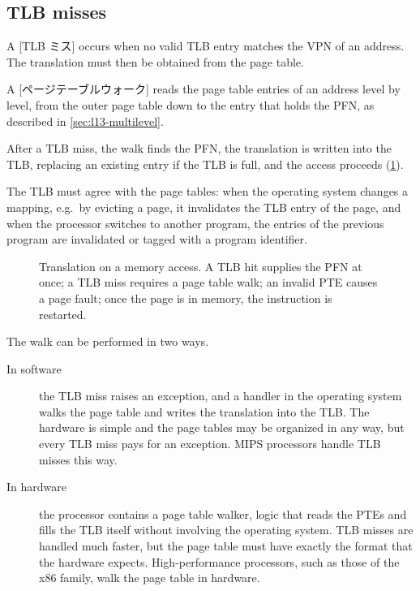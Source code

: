 \documentclass[../main.tex]{subfiles}
\begin{document}
\subsection{TLB misses}

A [TLB ミス] occurs when no valid TLB entry matches the VPN of
an address.  The translation must then be obtained from the page table.

\begin{definition}
  A [ページテーブルウォーク] reads the page table
  entries of an address level by level, from the outer page table down to the
  entry that holds the PFN, as described in \cref{sec:l13-multilevel}.
\end{definition}

After a TLB miss, the walk finds the PFN, the translation is written into the
TLB, replacing an existing entry if the TLB is full, and the access proceeds
(\cref{fig:l13-tlb-flow}).

The TLB must agree with the page tables: when the operating system changes a
mapping, e.g.\ by evicting a page, it invalidates the TLB entry of the page,
and when the processor switches to another program, the entries of the
previous program are invalidated or tagged with a program identifier.

\begin{figure}[htbp]
  \centering
  
  \caption{Translation on a memory access.  A TLB hit supplies the PFN at
    once; a TLB miss requires a page table walk; an invalid PTE causes a page
    fault; once the page is in memory, the instruction is restarted.}
  \label{fig:l13-tlb-flow}
\end{figure}

The walk can be performed in two ways.
\begin{description}
  \item[In software] the TLB miss raises an exception, and a handler in the
    operating system walks the page table and writes the translation into the
    TLB.  The hardware is simple and the page tables may be organized in any
    way, but every TLB miss pays for an exception.  MIPS processors handle TLB
    misses this way.
  \item[In hardware] the processor contains a page table walker, logic that
    reads the PTEs and fills the TLB itself without involving the operating
    system.  TLB misses are handled much faster, but the page table must have
    exactly the format that the hardware expects.  High-performance processors,
    such as those of the x86 family, walk the page table in hardware.
\end{description}
\end{document}
